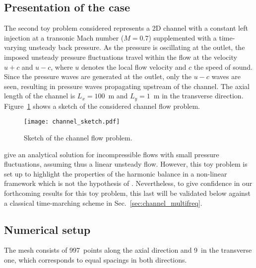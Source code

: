 \subsection{Presentation of the case}
\label{sec:channel_flow_problem}

The second toy problem considered represents a 2D channel 
with a constant left injection at 
a transonic Mach number ($M=0.7$)
supplemented with a time-varying unsteady back pressure.
As the pressure is oscillating at the outlet, the imposed unsteady pressure
fluctuations travel within the flow at the velocity 
$u + c$ and $u - c$, where $u$ denotes 
the local flow velocity and $c$ the speed of sound.
Since the pressure waves are generated at the outlet, only
the $u-c$ waves are seen, resulting in pressure waves propagating
upstream of the channel. The axial length of the channel is $L_x = 100$~m
and $L_y = 1$~m in the transverse direction.
Figure~\ref{fig:canal_principle} shows a sketch
of the considered channel flow problem.
\begin{figure}[htp]
  \centering
  \texttt{[image: channel\_sketch.pdf]}
  \caption{Sketch of the channel flow problem.}
  \label{fig:canal_principle}
\end{figure}

\citet{Merkle1987} give an analytical solution
for incompressible flows with small pressure fluctuations, assuming
thus a linear unsteady flow.
However, this toy problem is set up to highlight the properties
of the harmonic balance in a non-linear framework which is not
the hypothesis of \citet{Merkle1987}. Nevertheless, to give confidence
in our forthcoming results for this toy problem,
this last will be validated below against a classical time-marching scheme
in Sec.~\ref{sec:channel_multifreq}.

\subsection{Numerical setup}

The mesh consists of 997~points along the axial direction and 9~in the
transverse one, which corresponds to equal spacings in both
directions. 

